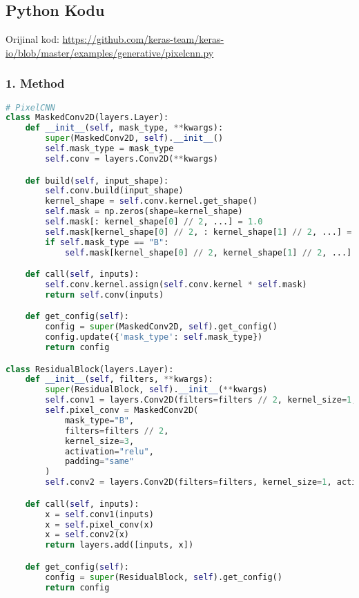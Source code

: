 \subsection{Python Kodu}

Orijinal kod: \url{https://github.com/keras-team/keras-io/blob/master/examples/generative/pixelcnn.py}

\subsubsection{1. Method}

\begin{lstlisting}[language=Python]
# PixelCNN
class MaskedConv2D(layers.Layer):
    def __init__(self, mask_type, **kwargs):
        super(MaskedConv2D, self).__init__()
        self.mask_type = mask_type
        self.conv = layers.Conv2D(**kwargs)

    def build(self, input_shape):
        self.conv.build(input_shape)
        kernel_shape = self.conv.kernel.get_shape()
        self.mask = np.zeros(shape=kernel_shape)
        self.mask[: kernel_shape[0] // 2, ...] = 1.0
        self.mask[kernel_shape[0] // 2, : kernel_shape[1] // 2, ...] = 1.0
        if self.mask_type == "B":
            self.mask[kernel_shape[0] // 2, kernel_shape[1] // 2, ...] = 1.0

    def call(self, inputs):
        self.conv.kernel.assign(self.conv.kernel * self.mask)
        return self.conv(inputs)

    def get_config(self):
        config = super(MaskedConv2D, self).get_config()
        config.update({'mask_type': self.mask_type})
        return config

class ResidualBlock(layers.Layer):
    def __init__(self, filters, **kwargs):
        super(ResidualBlock, self).__init__(**kwargs)
        self.conv1 = layers.Conv2D(filters=filters // 2, kernel_size=1, activation="relu")
        self.pixel_conv = MaskedConv2D(
            mask_type="B",
            filters=filters // 2,
            kernel_size=3,
            activation="relu",
            padding="same"
        )
        self.conv2 = layers.Conv2D(filters=filters, kernel_size=1, activation="relu")

    def call(self, inputs):
        x = self.conv1(inputs)
        x = self.pixel_conv(x)
        x = self.conv2(x)
        return layers.add([inputs, x])

    def get_config(self):
        config = super(ResidualBlock, self).get_config()
        return config


\end{lstlisting}
